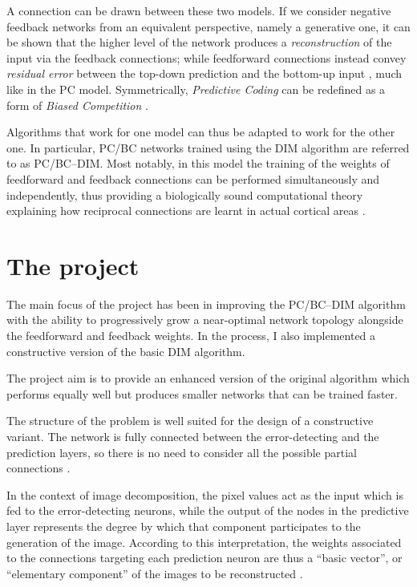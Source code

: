 \documentclass[11pt,a4paper]{report}
\newcommand{\quot}[1]{``#1''}
\begin{document}
		A connection can be drawn between these two models. If we consider negative feedback networks from an equivalent perspective, namely a generative one, it can be shown that the higher level of the network produces a \emph{reconstruction} of the input via the feedback connections; while feedforward connections instead convey \emph{residual error} between the top-down prediction and the bottom-up input \cite{spratling2009unsupervised}, much like in the PC model.
		Symmetrically, \emph{Predictive Coding} can be redefined as a form of \emph{Biased Competition} \cite{spratling2008predictive}.
		
		Algorithms that work for one model can thus be adapted to work for the other one. In particular, PC/BC networks trained using the DIM algorithm are referred to as PC/BC--DIM. Most notably, in this model the training of the weights of feedforward and feedback connections can be performed simultaneously and independently, thus providing a biologically sound computational theory explaining how reciprocal connections are learnt in actual cortical areas \cite{callaway1998local,spratling2012unsupervised}.
		
		\section{The project}
		The main focus of the project has been in improving the PC/BC--DIM algorithm with the ability to progressively grow a near-optimal network topology alongside the feedforward and feedback weights. In the process, I also implemented a constructive version of the basic DIM algorithm.
		
		The project aim is to provide an enhanced version of the original algorithm which performs equally well but produces smaller networks that can be trained faster.
		
		The structure of the problem is well suited for the design of a constructive variant. The network is fully connected between the error-detecting and the prediction layers, so there is no need to consider all the possible partial connections \cite{?}.
		
		In the context of image decomposition, the pixel values act as the input which is fed to the error-detecting neurons, while the output of the nodes in the predictive layer represents the degree by which that component participates to the generation of the image. According to this interpretation, the weights associated to the connections targeting each prediction neuron are thus a \quot{basic vector}, or \quot{elementary component} of the images to be reconstructed \cite{spratling2014predictive}.
\end{document}
